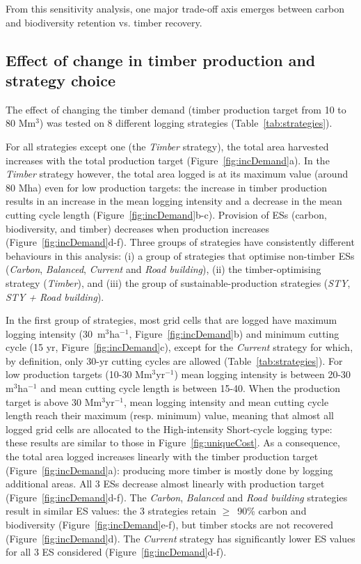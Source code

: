 \documentclass{article}
\begin{document}
From this sensitivity analysis, one major trade-off axis emerges between carbon and biodiversity retention vs. timber recovery. 



\subsection{Effect of change in timber production and strategy choice}

The effect of changing the timber demand (timber production target from 10 to 80 Mm$^3$) was tested on 8 different logging strategies (Table~\ref{tab:strategies}).

For all strategies except one (the \textit{Timber} strategy), the total area harvested increases with the total production target (Figure~\ref{fig:incDemand}a). 
In the \textit{Timber} strategy however, the total area logged is at its maximum value (around 80 Mha) even for low production targets: the increase in timber production results in an increase in the mean logging intensity and a decrease in the mean cutting cycle length (Figure~\ref{fig:incDemand}b-c). 
Provision of ESs (carbon, biodiversity, and timber) decreases when production increases (Figure~\ref{fig:incDemand}d-f).
Three groups of strategies have consistently different behaviours in this analysis: (i) a group of strategies that optimise non-timber ESs (\textit{Carbon}, \textit{Balanced}, \textit{Current} and \textit{Road building}), (ii) the timber-optimising strategy (\textit{Timber}), and (iii) the group of sustainable-production strategies (\textit{STY}, \textit{STY + Road building}). 

In the first group of strategies, most grid cells that are logged have maximum logging intensity (30~m$^3$ha$^{-1}$, Figure~\ref{fig:incDemand}b) and minimum cutting cycle (15 yr, Figure~\ref{fig:incDemand}c), except for the \textit{Current} strategy for which, by definition, only 30-yr cutting cycles are allowed (Table~\ref{tab:strategies}). For low production targets (10-30 Mm$^3$yr$^{-1}$) mean logging intensity is between 20-30 m$^3$ha$^{-1}$ and mean cutting cycle length is between 15-40. When the production target is above 30 Mm$^3$yr$^{-1}$, mean logging intensity and mean cutting cycle length reach their maximum (resp. minimum) value, meaning that almost all logged grid cells are allocated to the High-intensity Short-cycle logging type: these results are similar to those in Figure~\ref{fig:uniqueCost}. As a consequence, the total area logged increases linearly with the timber production target (Figure~\ref{fig:incDemand}a): producing more timber is mostly done by logging additional areas. All 3 ESs decrease almost linearly with production target (Figure~\ref{fig:incDemand}d-f). The \textit{Carbon}, \textit{Balanced} and \textit{Road building} strategies result in similar ES values: the 3 strategies retain $\geq$~90\% carbon and biodiversity (Figure~\ref{fig:incDemand}e-f), but timber stocks are not recovered  (Figure~\ref{fig:incDemand}d). The \textit{Current} strategy has significantly lower ES values for all 3 ES considered (Figure~\ref{fig:incDemand}d-f).
\end{document}
